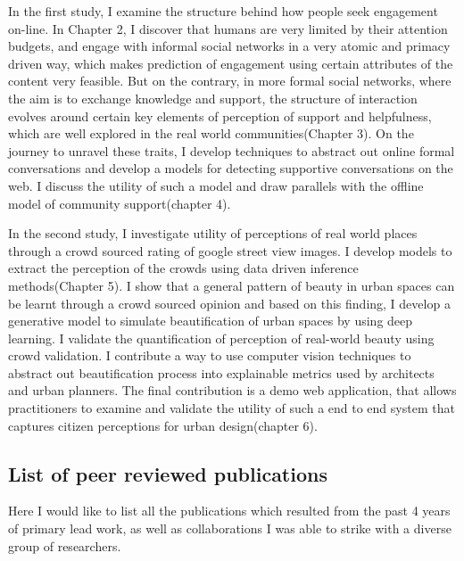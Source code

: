 In the first study, I examine the structure behind how people seek engagement on-line. In Chapter 2, I discover that humans are very limited by their attention budgets, and engage with informal social networks in a very atomic and primacy driven way, which makes prediction of engagement using certain attributes of the content very feasible. But on the contrary, in more formal social networks, where the aim is to exchange knowledge and support, the structure of interaction evolves around certain key elements of perception of support and helpfulness, which are well explored in the real world communities(Chapter 3). On the journey to unravel these traits, I develop techniques to abstract out online formal conversations and develop a models for detecting supportive conversations on the web. I discuss the utility of such a model and draw parallels with the offline model of community support(chapter 4). 

In the second study, I investigate utility of perceptions of real world places through a crowd sourced rating of google street view images. I develop models to extract the perception of the crowds using data driven inference methods(Chapter 5).
I show that a general pattern of beauty in urban spaces can be learnt through a crowd sourced opinion and based on this finding, I develop a generative model to simulate beautification of urban spaces by using deep learning. I validate the quantification of perception of real-world beauty using crowd validation. I contribute a way to use computer vision techniques to abstract out beautification process into explainable metrics used by architects and urban planners. The final contribution is a demo web application, that allows practitioners to examine and validate the utility of such a end to end system that captures citizen perceptions for urban design(chapter 6). 



\subsection{List of peer reviewed publications}

Here I would like to list all the publications which resulted from the past 4 years of primary lead work, as well as collaborations I was able to strike with a diverse group of researchers.

